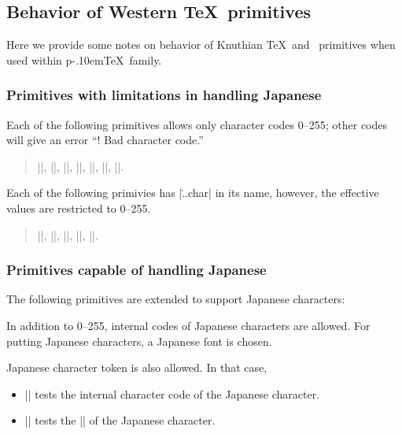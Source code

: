 \documentclass[a4paper,11pt]{article}
\def\pTeX{p\kern-.10em\TeX}
\begin{document}
\subsection{Behavior of Western \TeX\ primitives}

Here we provide some notes on behavior of Knuthian \TeX\ and \eTeX\ primitives
when used within \pTeX\ family.

\subsubsection{Primitives with limitations in handling Japanese}

Each of the following primitives allows only character codes 0--255;
other codes will give an error ``! Bad character code.''
\begin{quote}
 |\catcode|,
 |\sfcode|,
 |\mathcode|,
 |\delcode|,
 |\mathchardef|,
 |\lccode|,
 |\uccode|.
\end{quote}

Each of the following primivies has |\...char| in its name,
however, the effective values are restricted to 0--255.
\begin{quote}
 |\endlinechar|,
 |\newlinechar|,
 |\escapechar|,
 ||,
 ||.
\end{quote}

\subsubsection{Primitives capable of handling Japanese}

The following primitives are extended to support Japanese characters:
\begin{cslist}
 \csitem[\.{char} <character code>,
   \.{chardef} <control sequence>=<character code>]
  In addition to 0--255, internal codes of Japanese characters are allowed.
  For putting Japanese characters, a Japanese font is chosen.


 \csitem[\.{accent} <character code>=<character>]

  Japanese character token is also allowed.
  In that case,
  \begin{itemize}
    \item |\if| tests the internal character code of the Japanese character.
    \item |\ifcat| tests the |\kcatcode| of the Japanese character.
  \end{itemize}
\end{cslist}
\end{document}
